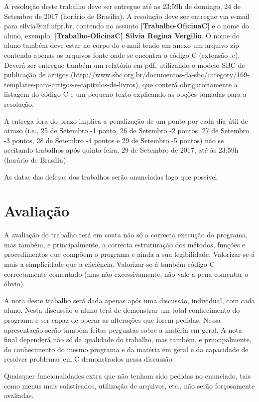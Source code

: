 \documentclass[defesa,oneside]{ppginf}
\begin{document}
A resolução deste trabalho deve ser entregue até as 23:59h de domingo, 24 de Setembro de 2017 (horário de Brasília).  A resolução deve ser entregue via e-mail para silvia@inf.ufpr.br, contendo no assunto \textbf{[Trabalho-OficinaC]} e o nome do aluno, exemplo, \textbf{[Trabalho-OficinaC] Silvia Regina Vergilio}. O nome do aluno também deve estar no corpo do e-mail tendo em anexo um arquivo zip contendo apenas os arquivos fonte onde se encontra o código C (extensão .c). Deverá ser entregue também um relatório em pdf, utilizando o modelo SBC de publicação de artigos (http://www.sbc.org.br/documentos-da-sbc/category/169-templates-para-artigos-e-capitulos-de-livros), que conterá obrigatoriamente a listagem do código C e um pequeno texto explicando as opções tomadas para a resolução.

A entrega fora do prazo implica a penalização de um ponto por cada dia útil de atraso (i.e., 25 de Setembro -1 ponto, 26 de Setembro -2 pontos, 27 de Setembro -3 pontos, 28 de Setembro -4 pontos e 29 de Setembro -5 pontos) não se aceitando trabalhos após quinta-feira, 29 de Setembro de 2017, até às 23:59h (horário de Brasília).

As datas das defesas dos trabalhos serão anunciadas logo que possível. 

\section{Avaliação}

A avaliação do trabalho terá em conta não só a correcta execução do programa, mas também, e principalmente, a correcta estruturação dos métodos, funções e procedimentos que compõem o programa e ainda a sua legibilidade. Valorizar-se-á mais a simplicidade que a eficiência. Valorizar-se-á também código C correctamente comentado (mas não excessivamente, não vale a pena comentar o óbvio).

A nota deste trabalho será dada apenas após uma discussão, individual, com cada aluno. Nesta discussão o aluno terá de demonstrar um total conhecimento do programa e ser capaz de operar as alterações que forem pedidas. Nessa apresentação serão também feitas perguntas sobre a matéria em geral. A nota final dependerá não só da qualidade do trabalho, mas também, e principalmente, do conhecimento do mesmo programa e da matéria em geral e da capacidade de resolver problemas em C demonstrados nessa discussão.

Quaisquer funcionalidades extra que não tenham sido pedidas no enunciado, tais como menus mais sofisticados, utilização de arquivos, etc., não serão forçosamente avaliadas. 
\end{document}
